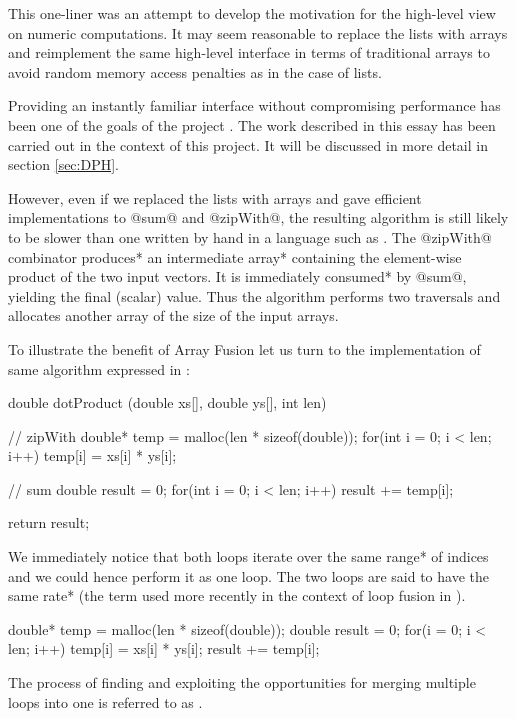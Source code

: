 \documentclass[preamble.tex]{subfiles}
\begin{document}
This one-liner was an attempt to develop the motivation for the high-level view on numeric computations. It may seem reasonable to replace the lists with arrays and reimplement the same high-level interface in terms of traditional arrays to avoid random memory access penalties as in the case of lists.

Providing an instantly familiar interface without compromising performance has been one of the goals of the \idph{} project \cite{PLKC08,CLP+07}. The work described in this essay has been carried out in the context of this project. It will be discussed in more detail in section \ref{sec:DPH}.

However, even if we replaced the lists with arrays and gave efficient implementations to @sum@ and @zipWith@, the resulting algorithm is still likely to be slower than one written by hand in a language such as \C. The @zipWith@ combinator \*produces* an \*intermediate array*\iintermediate{} containing the element-wise product of the two input vectors. It is immediately \*consumed* by @sum@, yielding the final (scalar) value. Thus the algorithm performs two traversals and allocates another array of the size of the input arrays.

To illustrate the benefit of Array Fusion let us turn to the implementation of same algorithm expressed in \C:


\begin{ccode}
double dotProduct (double xs[], double ys[], int len) {
	// zipWith
	double* temp = malloc(len * sizeof(double));
	for(int i = 0; i < len; i++)
		temp[i] = xs[i] * ys[i];

	// sum
	double result = 0;
	for(int i = 0; i < len; i++)
		result += temp[i];

	return result;
}
\end{ccode}


We immediately notice that both loops iterate over the same \*range* of indices and we could hence perform it as one loop. The two loops are said to have the same \*rate*\irate{} (the term used more recently in the context of loop fusion in \Haskell \cite{BenLippmeier:2014jc}).


\begin{ccode}
double* temp = malloc(len * sizeof(double));
double result = 0;
for(i = 0; i < len; i++) {
	temp[i] = xs[i] * ys[i];
	result += temp[i];
}
\end{ccode}


\begin{bluebox}
The process of finding and exploiting the opportunities for merging multiple loops into one is referred to as \ifusion{}.
\end{bluebox}
\end{document}
